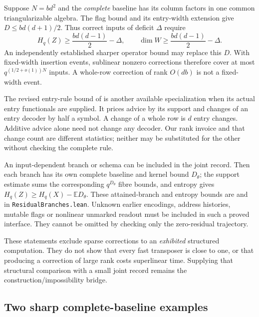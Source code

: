Suppose $N=bd^2$ and the \emph{complete} baseline has its column factors in
one common triangularizable algebra. The flag bound and its entry-width
extension give $D\le bd(d+1)/2$\cite[corollary ``One triangularizable side''
and remark ``Entries of $b$ bits'']{SeventeenthPaper2026}.
Thus correct inputs of deficit $\Delta$ require
\[
 H_q(Z)\ge \frac{bd(d-1)}2-\Delta,\qquad
 \dim W\ge \frac{bd(d-1)}2-\Delta.
\]
An independently established sharper operator bound may replace this $D$.
With fixed-width insertion events, sublinear nonzero corrections therefore
cover at most $q^{(1/2+o(1))N}$ inputs. A whole-row correction of rank $O(db)$
is not a fixed-width event.

The revised entry-rule bound of
\cite[Proposition~6.15 and Corollary~6.16]{SeventeenthPaper2026} is another
available specialization when its actual entry functionals are supplied.
It prices advice by its support and changes of an entry decoder by half a
symbol. A change of a whole row is $d$ entry changes. Additive advice alone
need not change any decoder. Our rank invoice and that change count are
different statistics; neither may be substituted for the other without
checking the complete rule.

An input-dependent branch or schema can be included in the joint record.
Then each branch has its own complete baseline and kernel bound $D_\theta$;
the support estimate sums the corresponding $q^{D_\theta}$ fibre bounds,
and entropy gives $H_q(Z)\ge H_q(X)-\mathbb E D_\theta$.
These attained-branch and entropy bounds are
 and
 in \texttt{ResidualBranches.lean}. Unknown earlier
encodings, address histories, mutable flags or nonlinear unmarked readout
must be included in such a proved interface. They cannot be omitted by
checking only the zero-residual trajectory.

These statements exclude sparse corrections to an \emph{exhibited}
structured computation. They do not show that every fast transposer is
close to one, or that producing a correction of large rank costs superlinear
time. Supplying that structural comparison with a small joint record
remains the construction/impossibility bridge.

\subsection{Two sharp complete-baseline examples}

